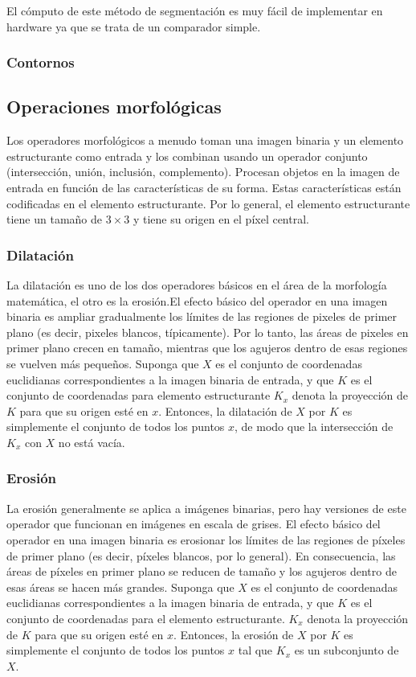 \documentclass[twoside,spanish,ESP,MSc]{plantillaLabUPV}
\theoremstyle{definition}
\begin{document}
El cómputo de este método de segmentación es muy fácil de implementar en hardware ya que se trata de un comparador simple.

\subsubsection{Contornos}

\subsection{Operaciones morfológicas}

Los operadores morfológicos a menudo toman una imagen binaria y un elemento estructurante como entrada y los combinan usando un operador conjunto (intersección, unión, inclusión, complemento). Procesan objetos en la imagen de entrada en función de las características de su forma. Estas características están codificadas en el elemento estructurante. Por lo general, el elemento estructurante tiene un tamaño de $3\times3$ y tiene su origen en el píxel central.\\


\subsubsection{Dilatación}

La dilatación es uno de los dos operadores básicos en el área de la morfología matemática, el otro es la erosión.El efecto básico del operador en una imagen binaria es ampliar gradualmente los límites de las regiones de pixeles de primer plano (es decir, pixeles blancos, típicamente). Por lo tanto, las áreas de pixeles en primer plano crecen en tamaño, mientras que los agujeros dentro de esas regiones se vuelven más pequeños. Suponga que $X$ es el conjunto de coordenadas euclidianas correspondientes a la imagen binaria de entrada, y que $K$ es el conjunto de coordenadas para elemento estructurante $K_x$ denota la proyección de $K$ para que su origen esté en $x$. Entonces, la dilatación de $X$ por $K$ es simplemente el conjunto de todos los puntos $x$, de modo que la intersección de $K_x$ con $X$ no está vacía.\\


\subsubsection{Erosión}
La erosión generalmente se aplica a imágenes binarias, pero hay versiones de este operador que funcionan en imágenes en escala de grises. El efecto básico del operador en una imagen binaria es erosionar los límites de las regiones de píxeles de primer plano (es decir, píxeles blancos, por lo general). En consecuencia, las áreas de píxeles en primer plano se reducen de tamaño y los agujeros dentro de esas áreas se hacen más grandes.
Suponga que $X$ es el conjunto de coordenadas euclidianas correspondientes a la imagen binaria de entrada, y que $K$ es el conjunto de coordenadas para el elemento estructurante.
$K_x$ denota la proyección de $K$ para que su origen esté en $x$.
Entonces, la erosión de $X$ por $K$ es simplemente el conjunto de todos los puntos $x$ tal que $K_x$ es un subconjunto de $X$.
\end{document}
